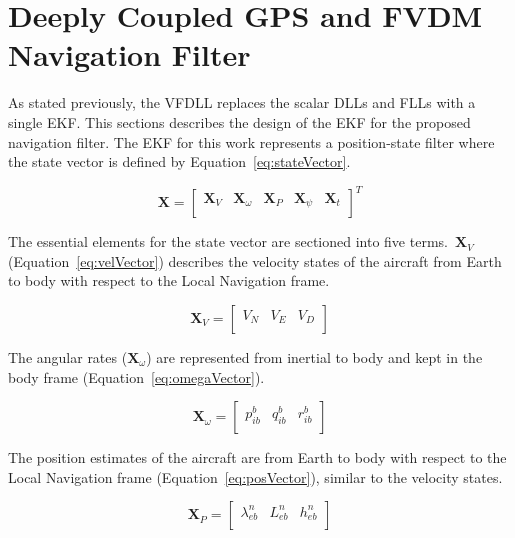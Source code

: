 \section{Deeply Coupled GPS and FVDM Navigation Filter}
As stated previously, the VFDLL replaces the scalar DLLs and FLLs with a single EKF\@. This sections describes the design of the EKF for the proposed navigation filter. The EKF for this work represents a position-state filter where the state vector is defined by Equation~\ref{eq:stateVector}.

\begin{equation}\label{eq:stateVector}
    \mathbf{X} =
    \begin{bmatrix}
        \mathbf{X}_V & \mathbf{X}_{\omega} & \mathbf{X}_P & \mathbf{X}_{\psi} & \mathbf{X}_t \\
    \end{bmatrix}^T
\end{equation}

The essential elements for the state vector are sectioned into five terms.~\(\mathbf{X}_V\) (Equation~\ref{eq:velVector}) describes the velocity states of the aircraft from Earth to body with respect to the Local Navigation frame.

\begin{equation}\label{eq:velVector}
    \mathbf{X}_V =
    \begin{bmatrix}
        V_N & V_E & V_D \\
    \end{bmatrix}
\end{equation}

The angular rates (\(\mathbf{X}_{\omega}\)) are represented from inertial to body and kept in the body frame (Equation~\ref{eq:omegaVector}).

\begin{equation}\label{eq:omegaVector}
    \mathbf{X}_{\omega} =
    \begin{bmatrix}
        p_{ib}^b & q_{ib}^b & r_{ib}^b \\
    \end{bmatrix}
\end{equation}

The position estimates of the aircraft are from Earth to body with respect to the Local Navigation frame (Equation~\ref{eq:posVector}), similar to the velocity states.

\begin{equation}\label{eq:posVector}
    \mathbf{X}_P =
    \begin{bmatrix}
        \lambda_{eb}^n & L_{eb}^n & h_{eb}^n \\
    \end{bmatrix}
\end{equation}

